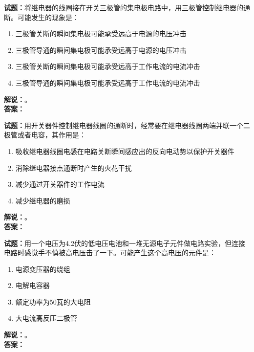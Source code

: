 \documentclass{ctexbook}
\begin{document}
\vspace{\baselineskip}

\noindent\textbf{试题：}将继电器的线圈接在开关三极管的集电极电路中，用三极管控制继电器的通断。可能发生的现象是：
\begin{enumerate}[leftmargin=3em]
  \item 三极管关断的瞬间集电极可能承受远高于电源的电压冲击
  \item 三极管导通的瞬间集电极可能承受远高于电源的电压冲击
  \item 三极管关断的瞬间集电极可能承受远高于工作电流的电流冲击
  \item 三极管导通的瞬间集电极可能承受远高于工作电流的电流冲击
\end{enumerate}
\noindent\textbf{解说：}\textbf{}。\\\noindent\textbf{答案：}

\vspace{\baselineskip}

\noindent\textbf{试题：}用开关器件控制继电器线圈的通断时，经常要在继电器线圈两端并联一个二极管或者电容，其作用是：
\begin{enumerate}[leftmargin=3em]
  \item 吸收继电器线圈电感在电路关断瞬间感应出的反向电动势以保护开关器件
  \item 消除继电器接点通断时产生的火花干扰
  \item 减少通过开关器件的工作电流
  \item 减少继电器的磨损
\end{enumerate}
\noindent\textbf{解说：}\textbf{}。\\\noindent\textbf{答案：}

\vspace{\baselineskip}

\noindent\textbf{试题：}用一个电压为4.2伏的低电压电池和一堆无源电子元件做电路实验，但连接电路时感觉手不慎被高电压击了一下。可能产生这个高电压的元件是：
\begin{enumerate}[leftmargin=3em]
  \item 电源变压器的绕组
  \item 电解电容器
  \item 额定功率为50瓦的大电阻
  \item 大电流高反压二极管
\end{enumerate}
\noindent\textbf{解说：}\textbf{}。\\\noindent\textbf{答案：}

\vspace{\baselineskip}
\end{document}

